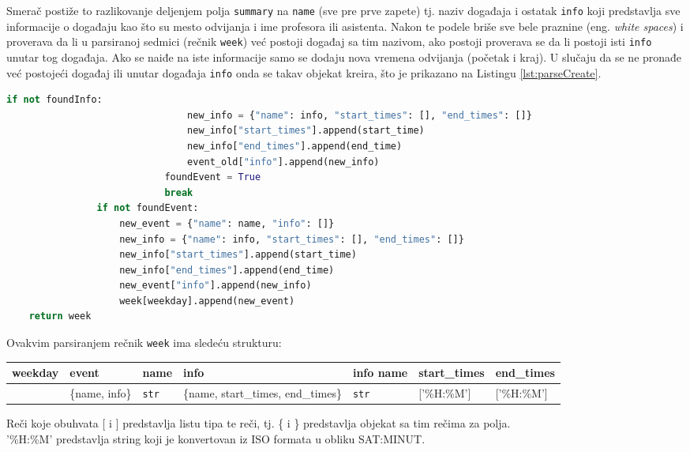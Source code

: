 \documentclass[a4paper,11pt]{article}
\begin{document}
\newpage
Smerač postiže to razlikovanje deljenjem polja \texttt{summary} na \texttt{name} (sve pre prve zapete) tj. naziv događaja i ostatak \texttt{info} koji predstavlja sve informacije o događaju kao što su mesto odvijanja i ime profesora ili asistenta. Nakon te podele briše sve bele praznine (eng. \textit{white spaces}) i proverava da li u parsiranoj sedmici (rečnik \texttt{week}) već postoji događaj sa tim nazivom, ako postoji proverava se da li postoji isti \texttt{info} unutar tog događaja. Ako se naiđe na iste informacije samo se dodaju nova vremena odvijanja (početak i kraj). U slučaju da se ne pronađe već postojeći događaj ili unutar događaja \texttt{info} onda se takav objekat kreira, što je prikazano na Listingu \ref{lst:parseCreate}.
\begin{lstlisting}[language=Python, caption=Parsiranje sedmice, label=lst:parseCreate]
                            if not foundInfo:
                                new_info = {"name": info, "start_times": [], "end_times": []}
                                new_info["start_times"].append(start_time)
                                new_info["end_times"].append(end_time)
                                event_old["info"].append(new_info)
                            foundEvent = True
                            break
                if not foundEvent:
                    new_event = {"name": name, "info": []}
                    new_info = {"name": info, "start_times": [], "end_times": []}
                    new_info["start_times"].append(start_time)
                    new_info["end_times"].append(end_time)
                    new_event["info"].append(new_info)
                    week[weekday].append(new_event)
    return week
\end{lstlisting}
Ovakvim parsiranjem rečnik \texttt{week} ima sledeću strukturu:
\begin{center}
\begin{tabular}{|p{1.3cm}|p{1.4cm}|p{1.55cm}|p{2cm}|p{1.9cm}|p{2cm}|p{1.8cm}|}
    \hline
    weekday & event & name & info & info name & start\_times & end\_times \\
    \hline
    [event] & \{name, info\} & \texttt{str} & \{name, start\_times, end\_times\} & \texttt{str} & ['\%H:\%M'] & ['\%H:\%M'] \\
    \hline
\end{tabular}
\end{center}
Reči koje obuhvata [ i ] predstavlja listu tipa te reči, tj. \{ i \} predstavlja objekat sa tim rečima za polja.
\\
'\%H:\%M' predstavlja string koji je konvertovan iz ISO formata u obliku SAT:MINUT.
\newpage
\end{document}
